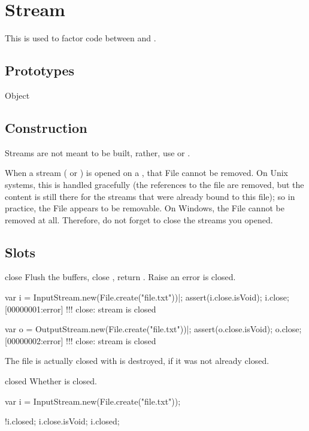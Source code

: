 
\section{Stream}

This is used to factor code between  and
.

\subsection{Prototypes}
\begin{refObjects}
\item[Object]
\end{refObjects}

\subsection{Construction}
\label{sec:specs:Stream:ctor}

Streams are not meant to be built, rather, use  or
.

When a stream ( or ) is
opened on a , that File cannot be removed.  On Unix systems,
this is handled gracefully (the references to the file are removed, but the
content is still there for the streams that were already bound to this
file); so in practice, the File appears to be removable.  On Windows, the
File cannot be removed at all.  Therefore, do not forget to close the
streams you opened.

\subsection{Slots}

\begin{urbiscriptapi}
\item[close] Flush the buffers, close \this, return .  Raise
  an error \this is closed.
\begin{urbiscript}
var i = InputStream.new(File.create("file.txt"))|;
assert(i.close.isVoid);
i.close;
[00000001:error] !!! close: stream is closed

var o = OutputStream.new(File.create("file.txt"))|;
assert(o.close.isVoid);
o.close;
[00000002:error] !!! close: stream is closed
\end{urbiscript}

  The file is actually closed with \this is destroyed, if it was not already
  closed.

\item[closed] Whether \this is closed.
\begin{urbiassert}
var i = InputStream.new(File.create("file.txt"));

!i.closed;
i.close.isVoid;
i.closed;
\end{urbiassert}
\end{urbiscriptapi}

